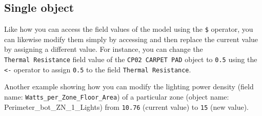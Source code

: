 \documentclass[
]{book}
\newenvironment{Shaded}{\begin{snugshade}}{\end{snugshade}}
\newcommand{\AttributeTok}[1]{\textcolor[rgb]{0.77,0.63,0.00}{#1}}
\newcommand{\DocumentationTok}[1]{\textcolor[rgb]{0.56,0.35,0.01}{\textbf{\textit{#1}}}}
\newcommand{\FloatTok}[1]{\textcolor[rgb]{0.00,0.00,0.81}{#1}}
\newcommand{\NormalTok}[1]{#1}
\newcommand{\OtherTok}[1]{\textcolor[rgb]{0.56,0.35,0.01}{#1}}
\newcommand{\SpecialCharTok}[1]{\textcolor[rgb]{0.00,0.00,0.00}{#1}}
\newcommand{\StringTok}[1]{\textcolor[rgb]{0.31,0.60,0.02}{#1}}
\begin{document}
\hypertarget{single-object}{%
\subsection{Single object}\label{single-object}}

Like how you can access the field values of the model using the \texttt{\$} operator, you can likewise modify them simply by accessing and then replace the current value by assigning a different value. For instance, you can change the \texttt{Thermal\ Resistance} field value of the \texttt{CP02\ CARPET\ PAD} object to \texttt{0.5} using the \texttt{\textless{}-} operator to assign \texttt{0.5} to the field \texttt{Thermal\ Resistance}.

\begin{Shaded}
\end{Shaded}

Another example showing how you can modify the lighting power density (field name: \texttt{Watts\_per\_Zone\_Floor\_Area}) of a particular zone (object name: Perimeter\_bot\_ZN\_1\_Lights) from \texttt{10.76} (current value) to \texttt{15} (new value).
\end{document}
